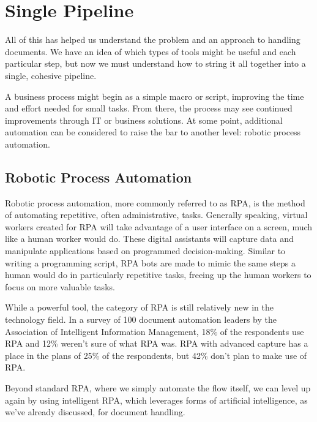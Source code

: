 \documentclass[conference]{IEEEtran}
\begin{document}
\section{Single Pipeline} \label{sectionSinglePipeline}
All of this has helped us understand the problem and an approach to handling documents. We have an idea of which types of tools might be useful and each particular step, but now we must understand how to string it all together into a single, cohesive pipeline.

A business process might begin as a simple macro or script, improving the time and effort needed for small tasks. From there, the process may see continued improvements through IT or business solutions. At some point, additional automation can be considered to raise the bar to another level: robotic process automation.

\subsection{Robotic Process Automation}
Robotic process automation, more commonly referred to as RPA, is the method of automating repetitive, often administrative, tasks. Generally speaking, virtual workers created for RPA will take advantage of a user interface on a screen, much like a human worker would do. These digital assistants will capture data and manipulate applications based on programmed decision-making. Similar to writing a programming script, RPA bots are made to mimic the same steps a human would do in particularly repetitive tasks, freeing up the human workers to focus on more valuable tasks.

While a powerful tool, the category of RPA is still relatively new in the technology field. In a survey of 100 document automation leaders by the Association of Intelligent Information Management, 18\% of the respondents use RPA and 12\% weren't sure of what RPA was. RPA with advanced capture has a place in the plans of 25\% of the respondents, but 42\% don't plan to make use of RPA. \cite{hollander2019survey}

Beyond standard RPA, where we simply automate the flow itself, we can level up again by using intelligent RPA, which leverages forms of artificial intelligence, as we've already discussed, for document handling.
\end{document}
